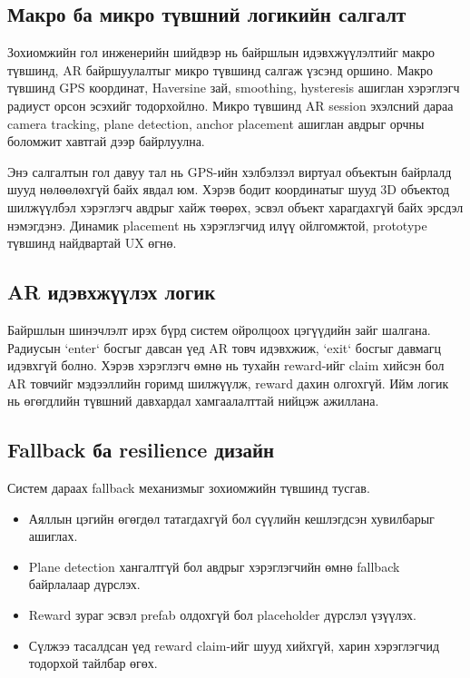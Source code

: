 \begin{sloppy}
\subsection{Макро ба микро түвшний логикийн салгалт}

Зохиомжийн гол инженерийн шийдвэр нь байршлын идэвхжүүлэлтийг макро түвшинд, AR байршуулалтыг микро түвшинд салгаж үзсэнд оршино. Макро түвшинд GPS координат, Haversine зай, smoothing, hysteresis ашиглан хэрэглэгч радиуст орсон эсэхийг тодорхойлно. Микро түвшинд AR session эхэлсний дараа camera tracking, plane detection, anchor placement ашиглан авдрыг орчны боломжит хавтгай дээр байрлуулна.

Энэ салгалтын гол давуу тал нь GPS-ийн хэлбэлзэл виртуал объектын байрлалд шууд нөлөөлөхгүй байх явдал юм. Хэрэв бодит координатыг шууд 3D объектод шилжүүлбэл хэрэглэгч авдрыг хайж төөрөх, эсвэл объект харагдахгүй байх эрсдэл нэмэгдэнэ. Динамик placement нь хэрэглэгчид илүү ойлгомжтой, prototype түвшинд найдвартай UX өгнө.

\subsection{AR идэвхжүүлэх логик}

Байршлын шинэчлэлт ирэх бүрд систем ойролцоох цэгүүдийн зайг шалгана. Радиусын `enter` босгыг давсан үед AR товч идэвхжиж, `exit` босгыг давмагц идэвхгүй болно. Хэрэв хэрэглэгч өмнө нь тухайн reward-ийг claim хийсэн бол AR товчийг мэдээллийн горимд шилжүүлж, reward дахин олгохгүй. Ийм логик нь өгөгдлийн түвшний давхардал хамгаалалттай нийцэж ажиллана.

\subsection{Fallback ба resilience дизайн}

Систем дараах fallback механизмыг зохиомжийн түвшинд тусгав.

\begin{itemize}
    \item Аяллын цэгийн өгөгдөл татагдахгүй бол сүүлийн кешлэгдсэн хувилбарыг ашиглах.
    \item Plane detection хангалтгүй бол авдрыг хэрэглэгчийн өмнө fallback байрлалаар дүрслэх.
    \item Reward зураг эсвэл prefab олдохгүй бол placeholder дүрслэл үзүүлэх.
    \item Сүлжээ тасалдсан үед reward claim-ийг шууд хийхгүй, харин хэрэглэгчид тодорхой тайлбар өгөх.
\end{itemize}


\end{sloppy}
